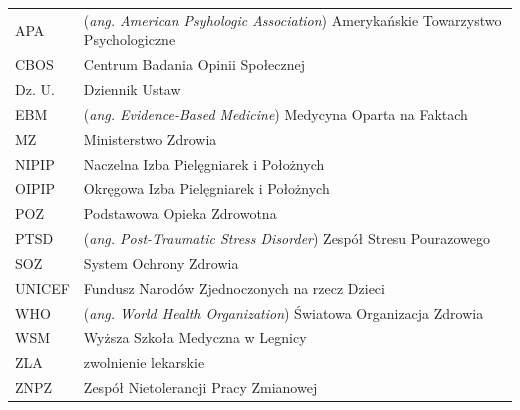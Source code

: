\documentclass[a4paper,12pt,twoside,openright]{mwrep}
\begin{document}
\begin{table}[ht]
    
    \label{tab:index}
	\begin{tabular}{  l  l  }
	
    APA & (\textit{ang. American Psyhologic Association}) Amerykańskie Towarzystwo Psychologiczne \\
	
	CBOS & Centrum Badania Opinii Społecznej \\

	Dz. U. & Dziennik Ustaw \\

	EBM & (\textit{ang. Evidence-Based Medicine}) Medycyna Oparta na Faktach \\

	MZ & Ministerstwo Zdrowia\\

	NIPIP & Naczelna Izba Pielęgniarek i Położnych\\

	OIPIP & Okręgowa Izba Pielęgniarek i Położnych\\

	POZ & Podstawowa Opieka Zdrowotna\\

	PTSD & (\textit{ang. Post-Traumatic Stress Disorder}) Zespół Stresu Pourazowego \\

	SOZ & System Ochrony Zdrowia\\
	
	UNICEF & Fundusz Narodów Zjednoczonych na rzecz Dzieci\\

	WHO & (\textit{ang. World Health Organization}) Światowa Organizacja Zdrowia \\
	
	WSM& Wyższa Szkoła Medyczna w Legnicy\\
     
     ZLA & zwolnienie lekarskie \\

	ZNPZ & Zespół Nietolerancji Pracy Zmianowej \\
	

	
	\end{tabular}
   

\end{table}
\end{document}
